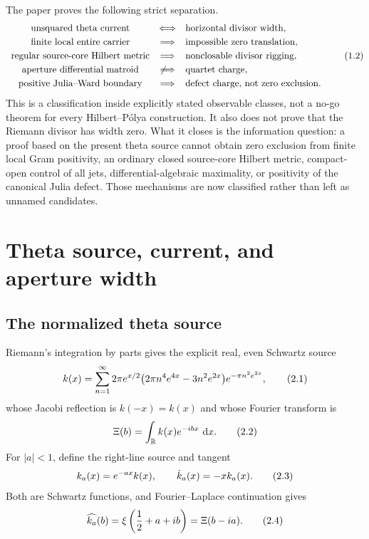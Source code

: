 \documentclass[11pt]{article}
\theoremstyle{definition}
\theoremstyle{remark}
\newcommand{\R}{\mathbb R}
\newcommand{\dd}{\,\mathrm d}
\newcommand{\eqtag}[1]{\qquad\text{\upshape(#1)}}
\begin{document}
The paper proves the following strict separation.
{\small
\[
\begin{array}{ccl}
\text{unsquared theta current}
  &\Longleftrightarrow& \text{horizontal divisor width},\\[1mm]
\text{finite local entire carrier}
  &\Longrightarrow& \text{impossible zero translation},\\[1mm]
\text{regular source-core Hilbert metric}
  &\Longrightarrow& \text{nonclosable divisor rigging},\\[1mm]
\text{aperture differential matroid}
  &\not\Longrightarrow& \text{quartet charge},\\[1mm]
\text{positive Julia--Ward boundary}
  &\Longrightarrow& \text{defect charge, not zero exclusion}.
\end{array}                                                    \eqtag{1.2}
\]
}
This is a classification inside explicitly stated observable classes,
not a no-go theorem for every Hilbert--P\'olya construction.  It also
does not prove that the Riemann divisor has width zero.  What it closes
is the information question: a proof based on the present theta source
cannot obtain zero exclusion from finite local Gram positivity,
an ordinary closed source-core Hilbert metric, compact-open control of
all jets, differential-algebraic maximality, or positivity of the
canonical Julia defect.  Those mechanisms are now classified rather
than left as unnamed candidates.

\section{Theta source, current, and aperture width}

\subsection{The normalized theta source}

Riemann's integration by parts gives the explicit real, even Schwartz
source
\[
 k(x)=\sum_{n=1}^{\infty}
 2\pi e^{x/2}
 \bigl(2\pi n^4e^{4x}-3n^2e^{2x}\bigr)
 e^{-\pi n^2e^{2x}},                                \eqtag{2.1}
\]
whose Jacobi reflection is \(k(-x)=k(x)\) and whose Fourier transform is
\[
  \Xi(b)=\int_{\R} k(x)e^{-ibx}\,\dd x.              \eqtag{2.2}
\]
For \(|a|<1\), define the
right-line source and tangent
\[
  k_a(x)=e^{-ax}k(x),\qquad \dot k_a(x)=-xk_a(x).
                                                               \eqtag{2.3}
\]
Both are Schwartz functions, and Fourier--Laplace continuation gives
\[
  \widehat{k_a}(b)=
  \xi\left(\frac12+a+ib\right)=\Xi(b-ia).            \eqtag{2.4}
\]
\end{document}
